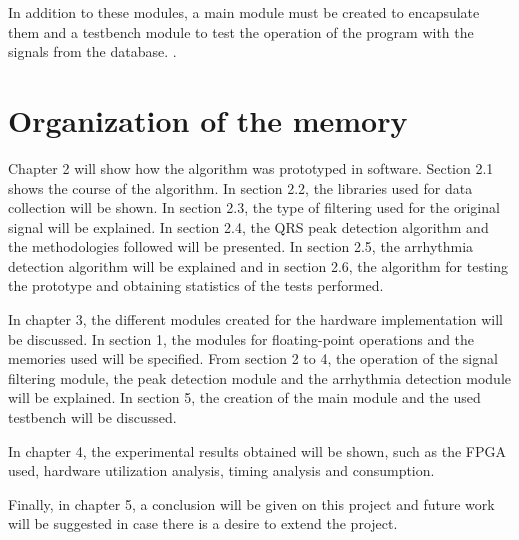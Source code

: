 	In addition to these modules, a main module must be created to encapsulate them and a testbench module to test the operation of the program with the signals from the database. \cite{desai2021low}.

\section*{Organization of the memory}
Chapter 2 will show how the algorithm was prototyped in software. Section 2.1 shows the course of the algorithm. In section 2.2, the libraries used for data collection will be shown. In section 2.3, the type of filtering used for the original signal will be explained. In section 2.4, the QRS peak detection algorithm and the methodologies followed will be presented. In section 2.5, the arrhythmia detection algorithm will be explained and in section 2.6, the algorithm for testing the prototype and obtaining statistics of the tests performed.

In chapter 3, the different modules created for the hardware implementation will be discussed. In section 1, the modules for floating-point operations and the memories used will be specified. From section 2 to 4, the operation of the signal filtering module, the peak detection module and the arrhythmia detection module will be explained. In section 5, the creation of the main module and the used testbench will be discussed.

In chapter 4, the experimental results obtained will be shown, such as the FPGA used, hardware utilization analysis, timing analysis and consumption.

Finally, in chapter 5, a conclusion will be given on this project and future work will be suggested in case there is a desire to extend the project.